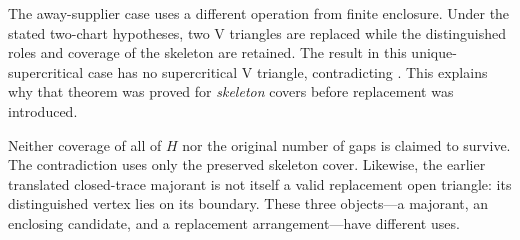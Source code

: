 The away-supplier case uses a different operation from finite enclosure.
Under the stated two-chart hypotheses, two V triangles are replaced while
the distinguished roles and coverage of the skeleton are retained. The
result in this unique-supercritical case has no supercritical V triangle, contradicting
. This explains why that theorem was proved for
\emph{skeleton} covers before replacement was introduced.

Neither coverage of all of $H$ nor the original number of gaps is claimed
to survive. The contradiction uses only the preserved skeleton cover.
Likewise, the earlier translated closed-trace majorant is not itself a
valid replacement open triangle: its distinguished vertex lies on its
boundary. These three objects---a majorant, an enclosing candidate, and a
replacement arrangement---have different uses.
